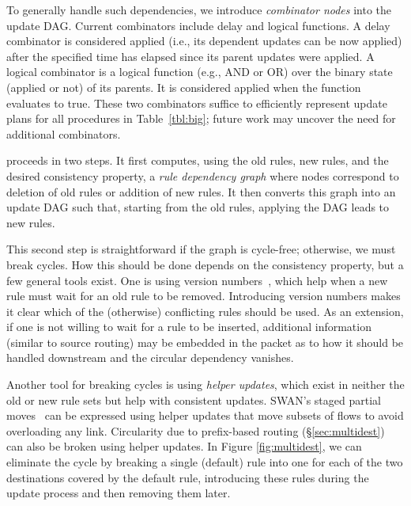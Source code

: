 To generally handle such dependencies, we introduce {\em combinator nodes} into the update DAG. Current combinators include delay and logical functions. A delay combinator is considered applied (i.e., its dependent updates can be now applied) after the specified time has elapsed since its parent updates were applied. A logical combinator is a logical function (e.g., AND or OR) over the binary state (applied or not) of its parents. It is considered applied when the function evaluates to true. These two combinators suffice to efficiently represent update plans for all procedures in Table~\ref{tbl:big}; future work may uncover the need for additional combinators.

 proceeds in two steps. It first computes, using the old rules, new rules, and the desired consistency property, a {\em rule dependency graph} where nodes correspond to deletion of old rules or addition of new rules. It then converts this graph into an update DAG such that, starting from the old rules, applying the DAG leads to new rules. 

This second step is straightforward if the graph is cycle-free; otherwise, we must break cycles. How this should be done depends on the consistency property, but a few general tools exist. One is using version numbers~\cite{safeupdate}, which help when a new rule must wait for an old rule to be removed. Introducing version numbers makes it clear which of the (otherwise) conflicting rules should be used. As an extension, if one is not willing to wait for a rule to be inserted, additional information (similar to source routing) may be embedded in the packet as to how it should be handled downstream  and the circular dependency vanishes.

Another tool for breaking cycles is using {\em helper updates}, which exist in neither the old or new rule sets but help with consistent updates. SWAN's staged partial moves~\cite{swan} can be expressed using helper updates that move subsets of flows to avoid overloading any link. Circularity due to prefix-based routing (\S\ref{sec:multidest}) can also be broken using helper updates. In Figure \ref{fig:multidest}, we can eliminate the cycle by breaking a single (default) rule into one for each of the two destinations covered by the default rule, introducing these rules during the update process and then removing them later.

%

